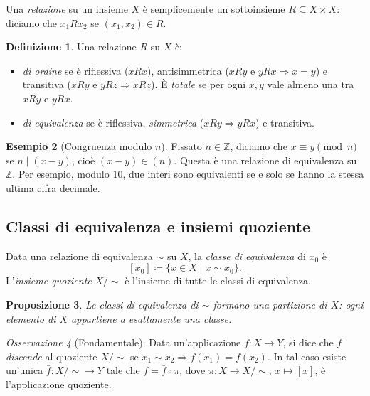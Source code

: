 \documentclass[11pt, a4paper]{book}
\theoremstyle{definition}
\newtheorem{definizione}{Definizione}[section]
\newtheorem{esempio}[definizione]{Esempio}
\theoremstyle{plain}
\newtheorem{proposizione}[definizione]{Proposizione}
\theoremstyle{remark}
\newtheorem{osservazione}[definizione]{Osservazione}
\newcommand{\Z}{\mathbb{Z}}
\begin{document}
Una \emph{relazione} su un insieme $X$ è semplicemente un sottoinsieme $R \subseteq X \times X$: diciamo che $x_1 R x_2$ se $(x_1, x_2) \in R$.

\begin{defbox}
\begin{definizione}
Una relazione $R$ su $X$ è:
\begin{itemize}
  \item \emph{di ordine} se è riflessiva ($xRx$), antisimmetrica ($xRy$ e $yRx \Rightarrow x=y$) e transitiva ($xRy$ e $yRz \Rightarrow xRz$). È \emph{totale} se per ogni $x, y$ vale almeno una tra $xRy$ e $yRx$.
  \item \emph{di equivalenza} se è riflessiva, \emph{simmetrica} ($xRy \Rightarrow yRx$) e transitiva.
\end{itemize}
\end{definizione}
\end{defbox}

\begin{exbox}
\begin{esempio}[Congruenza modulo $n$]
Fissato $n \in \Z$, diciamo che $x \equiv y \pmod{n}$ se $n \mid (x - y)$, cioè $(x-y) \in (n)$. Questa è una relazione di equivalenza su $\Z$. Per esempio, modulo $10$, due interi sono equivalenti se e solo se hanno la stessa ultima cifra decimale.
\end{esempio}
\end{exbox}

\subsection{Classi di equivalenza e insiemi quoziente}

Data una relazione di equivalenza $\sim$ su $X$, la \emph{classe di equivalenza} di $x_0$ è
\[
  [x_0] \coloneqq \{x \in X \mid x \sim x_0\}.
\]
L'\emph{insieme quoziente} $X/{\sim}$ è l'insieme di tutte le classi di equivalenza.

\begin{defbox}
\begin{proposizione}
Le classi di equivalenza di $\sim$ formano una \emph{partizione} di $X$: ogni elemento di $X$ appartiene a esattamente una classe.
\end{proposizione}
\end{defbox}

\begin{osservazione}[Fondamentale]
Data un'applicazione $f \colon X \to Y$, si dice che $f$ \emph{discende} al quoziente $X/{\sim}$ se $x_1 \sim x_2 \Rightarrow f(x_1) = f(x_2)$. In tal caso esiste un'unica $\bar{f} \colon X/{\sim} \to Y$ tale che $f = \bar{f} \circ \pi$, dove $\pi \colon X \to X/{\sim}$, $x \mapsto [x]$, è l'applicazione quoziente.
\end{osservazione}
\end{document}
